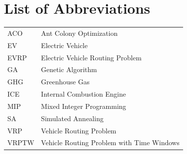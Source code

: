 \section*{List of Abbreviations}

\begin{tabular}{ll}
ACO & Ant Colony Optimization \\
EV & Electric Vehicle \\
EVRP & Electric Vehicle Routing Problem \\
GA & Genetic Algorithm \\
GHG & Greenhouse Gas \\
ICE & Internal Combustion Engine \\
MIP & Mixed Integer Programming \\
SA & Simulated Annealing \\
VRP & Vehicle Routing Problem \\
VRPTW & Vehicle Routing Problem with Time Windows \\
\end{tabular}
